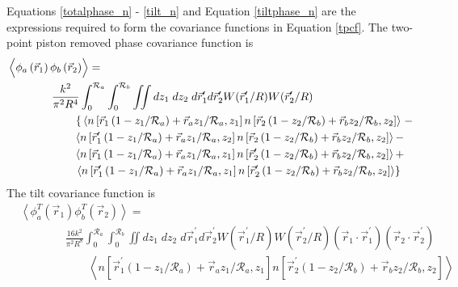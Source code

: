 Equations \ref{totalphase_n} - \ref{tilt_n} and Equation
\ref{tiltphase_n} are the expressions required to form the covariance
functions in Equation \ref{tpcf}.  The two-point piston removed phase
covariance function is
\begin{equation}\label{prphase_n}
\begin{aligned}
&\left\langle \vphantom{\hat{\phi}_{a}} \phi_{a}\left(\vec{r}_{1}\right) \phi_{b}\left(\vec{r}_{2}\right)\right\rangle = \\
&\quad\quad\quad\quad
\frac{k^{2}}{\pi^{2}R^{4}} \int_{0}^{\mathcal{R}_{a}}  \int_{0}^{\mathcal{R}_{b}} \iint dz_{1} \; dz_{2} \; d\vec{r}^{\prime}_{1}d\vec{r}^{\prime}_{2} W(\vec{r}^{\prime}_{1}/R) W(\vec{r}^{\prime}_{2}/R) \\
&\quad\quad\quad\quad\quad\quad
\left\{\vphantom{\vec{r}^{\prime}_{1}}
\left\langle n\left[\vec{r}_{1}\left(1-z_{1}/\mathcal{R}_{a}\right) + \vec{r}_{a} z_{1}/\mathcal{R}_{a}, z_{1}\right]
 n\left[\vec{r}_{2}\left(1-z_{2}/\mathcal{R}_{b}\right) + \vec{r}_{b} z_{2}/\mathcal{R}_{b}, z_{2}\right] \right\rangle\right. -
\\
&\quad\quad\quad\quad\quad\quad
\left\langle n\left[\vec{r}^{\prime}_{1}\left(1-z_{1}/\mathcal{R}_{a}\right) + \vec{r}_{a} z_{1}/\mathcal{R}_{a}, z_{2}\right]
 n\left[\vec{r}_{2}\left(1-z_{2}/\mathcal{R}_{b}\right) + \vec{r}_{b} z_{2}/\mathcal{R}_{b}, z_{2}\right] \right\rangle -
\\
&\quad\quad\quad\quad\quad\quad
\left\langle n\left[\vec{r}_{1}\left(1-z_{1}/\mathcal{R}_{a}\right) + \vec{r}_{a} z_{1}/\mathcal{R}_{a}, z_{1}\right]
 n\left[\vec{r}^{\prime}_{2}\left(1-z_{2}/\mathcal{R}_{b}\right) + \vec{r}_{b} z_{2}/\mathcal{R}_{b}, z_{2}\right] \right\rangle +
\\
&\quad\quad\quad\quad\quad\quad
\left.
\left\langle n\left[\vec{r}^{\prime}_{1}\left(1-z_{1}/\mathcal{R}_{a}\right) + \vec{r}_{a} z_{1}/\mathcal{R}_{a}, z_{1}\right]
 n\left[\vec{r}^{\prime}_{2}\left(1-z_{2}/\mathcal{R}_{b}\right) + \vec{r}_{b} z_{2}/\mathcal{R}_{b}, z_{2}\right] \right\rangle
\right\}
\end{aligned}
\end{equation}
The tilt covariance function is
\begin{equation}\label{tphase_n}
\begin{aligned}
&\left\langle \phi^{T}_{a}\left(\vec{r}_{1}\right) \phi^{T}_{b}\left(\vec{r}_{2}\right)\right\rangle = \\
&\quad\quad\quad\quad
\frac{16 k^{2}}{\pi^{2}R^{8}} \int_{0}^{\mathcal{R}_{a}}  \int_{0}^{\mathcal{R}_{b}} \iint dz_{1} \; dz_{2} \; d\vec{r}^{\prime}_{1}d\vec{r}^{\prime}_{2} W(\vec{r}^{\prime}_{1}/R) W(\vec{r}^{\prime}_{2}/R)
\left(\vec{r}_{1} \cdot \vec{r}^{\prime}_{1}\right)
\left(\vec{r}_{2} \cdot \vec{r}^{\prime}_{2}\right)
\\
&\quad\quad\quad\quad\quad\quad
\left\langle n\left[\vec{r}^{\prime}_{1}\left(1-z_{1}/\mathcal{R}_{a}\right) + \vec{r}_{a} z_{1}/\mathcal{R}_{a}, z_{1}\right]
 n\left[\vec{r}^{\prime}_{2}\left(1-z_{2}/\mathcal{R}_{b}\right) + \vec{r}_{b} z_{2}/\mathcal{R}_{b}, z_{2}\right] \right\rangle
\end{aligned}
\end{equation}
